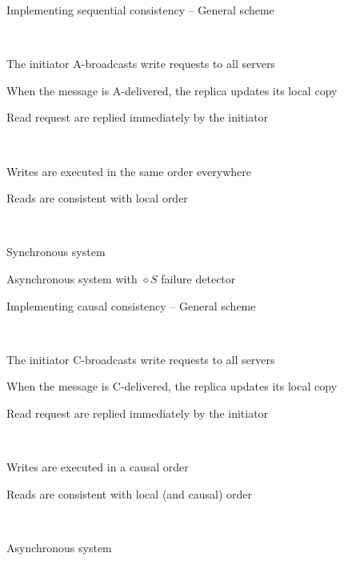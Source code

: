 \begin{frame}[t]{Implementing sequential consistency -- General scheme}

\\
\BI
\item The initiator A-broadcasts write requests to all servers
\item When the message is A-delivered, the replica updates its local copy
\item Read request are replied immediately by the initiator
\EI

\smallskip
{}\\
\BI
\item Writes are executed in the same order everywhere
\item Reads are consistent with local order
\EI

\smallskip
{}\\
\BI
\item Synchronous system
\item Asynchronous system with $\diamond S$ failure detector
\EI

\end{frame}

\begin{frame}[t]{Implementing causal consistency -- General scheme}

\\
\BI
\item The initiator C-broadcasts write requests to all servers
\item When the message is C-delivered, the replica updates its local copy
\item Read request are replied immediately by the initiator
\EI

\smallskip
{}\\
\BI
\item Writes are executed in a causal order
\item Reads are consistent with local (and causal) order
\EI

\smallskip
{}\\
\BI
\item Asynchronous system
\EI

\end{frame}


